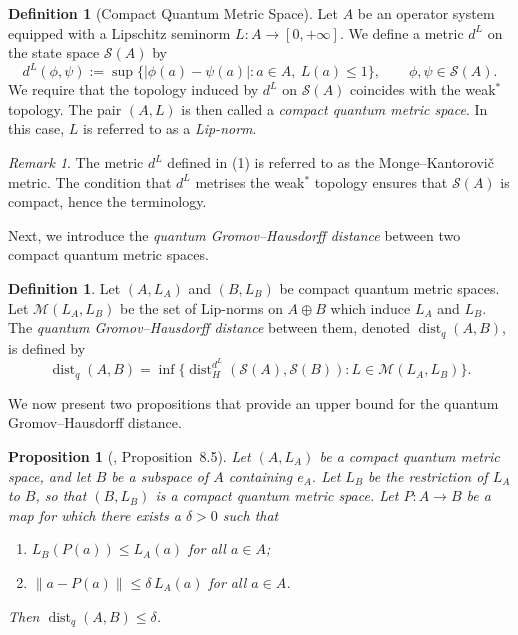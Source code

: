 \documentclass[12pt, reqno]{amsart}
\newtheorem{proposition}[theorem]{Proposition}
\theoremstyle{definition}
\newtheorem{definition}[theorem]{Definition}
\theoremstyle{remark}
\newtheorem{remark}[theorem]{Remark}
\numberwithin{equation}{section}
\begin{document}
\begin{definition}[Compact Quantum Metric Space]\label{Definition2.2}
Let $A$ be an operator system equipped with a Lipschitz seminorm 
$L \colon A \to [0,+\infty]$. We define a metric $d^L$ on the state 
space $\mathcal{S}(A)$ by
\begin{equation}\label{eq:dist}\tag{1}
    d^L(\phi, \psi) 
    := \sup\bigl\{ |\phi(a) - \psi(a)| : a \in A,\ L(a) \leq 1 \bigr\},
    \qquad \phi, \psi \in \mathcal{S}(A).
\end{equation}
We require that the topology induced by $d^L$ on $\mathcal{S}(A)$ coincides with 
the weak$^{*}$ topology. The pair $(A, L)$ is then called a 
\emph{compact quantum metric space}. In this case, $L$ is referred to 
as a \emph{Lip-norm}.
\end{definition}



\begin{remark}
The metric $d^L$ defined in (1) is referred to as the 
Monge--Kantorovi\v{c} metric. The condition that $d^L$ metrises 
the weak$^{*}$ topology ensures that $\mathcal{S}(A)$ is compact, hence the 
terminology.
\end{remark}

Next, we introduce the \emph{quantum Gromov--Hausdorff distance} 
between two compact quantum metric spaces.

\begin{definition}\label{Definition2.4}
Let $(A, L_A)$ and $(B, L_B)$ be compact quantum metric spaces. 
Let $\mathcal{M}(L_A, L_B)$ be the set of Lip-norms on $A \oplus B$ 
which induce $L_A$ and $L_B$. The \emph{quantum Gromov--Hausdorff 
distance} between them, denoted $\operatorname{dist}_q(A, B)$, is 
defined by
\[
\operatorname{dist}_q(A, B) = \inf\bigl\{ 
\operatorname{dist}_H^{d^L}(\mathcal{S}(A), \mathcal{S}(B)) : L \in \mathcal{M}(L_A, L_B) 
\bigr\}.
\]
\end{definition}

We now present two propositions that provide an upper bound for the 
quantum Gromov--Hausdorff distance.

\begin{proposition}[\cite{9}, Proposition~8.5]\label{prop:upper_bound}
Let $(A, L_A)$ be a compact quantum metric space, and let $B$ be a 
subspace of $A$ containing $e_A$. Let $L_B$ be the restriction of 
$L_A$ to $B$, so that $(B, L_B)$ is a compact quantum metric space. 
Let $P : A \to B$ be a map 
for which there exists a $\delta > 0$ such that
\begin{enumerate}
    \item $L_B(P(a)) \leq L_A(a)$ for all $a \in A$;
    \item $\|a - P(a)\| \leq \delta\, L_A(a)$ for all $a \in A$.
\end{enumerate}
Then $\operatorname{dist}_q(A, B) \leq \delta$.
\end{proposition}
\end{document}
